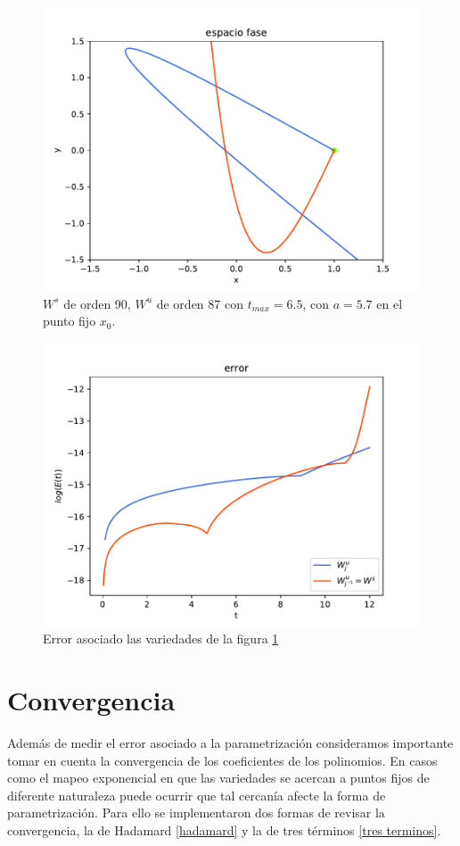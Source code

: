 \begin{figure}[H]
\centering
\includegraphics[scale=0.6]{jung57}
\caption{$W^{s}$ de orden 90, $W^{u}$ de orden 87 con $t_{max}=6.5$, con $a=5.7$ en el punto fijo $x_{0}$.}
\label{jung2}
\end{figure}


\begin{figure}[H]
\centering
\includegraphics[scale=0.6]{error_jung57}
\caption{Error asociado las variedades de la figura \ref{jung2}}
\label{errorjung2}
\end{figure}


\section{Convergencia}
Además de medir el error asociado a la parametrización consideramos importante tomar en cuenta la convergencia de los coeficientes de los polinomios. En casos como el mapeo exponencial en que las variedades se acercan a puntos fijos de diferente naturaleza puede ocurrir que tal cercanía afecte la forma de parametrización. Para ello se implementaron dos formas de revisar la convergencia, la de Hadamard \ref{hadamard} y la de tres términos \ref{tres terminos}. \\

